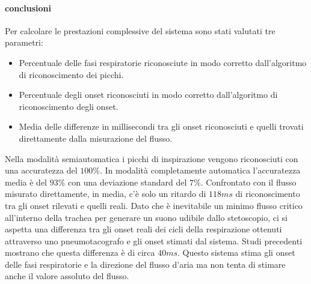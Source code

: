 \begin{frame}
  \paragraph{conclusioni}
    Per calcolare le prestazioni complessive del sistema sono stati valutati tre parametri:
    \begin{itemize}
      \item 
	Percentuale delle fasi respiratorie riconosciute in modo corretto dall'algoritmo di riconoscimento dei picchi.
      \item
	Percentuale degli onset riconosciuti in modo corretto dall'algoritmo di riconoscimento degli onset.
      \item
	Media delle differenze in millisecondi tra gli onset riconosciuti e quelli trovati direttamente dalla misurazione del flusso.
    \end{itemize}
    Nella modalit\`a semiautomatica i picchi di inspirazione vengono riconosciuti con una accuratezza del $100\%$. 
    In modalit\`a completamente automatica l'accuratezza media \`e del $93\%$ con una deviazione standard del $7\%$. 
    Confrontato con il flusso misurato direttamente, in media, c'\`e solo un ritardo di $118 ms$ di riconoscimento tra gli onset rilevati e quelli reali.
    Dato che \`e inevitabile un minimo flusso critico all'interno della trachea per generare un suono udibile dallo stetoscopio, ci si aspetta una differenza tra gli onset reali dei cicli della respirazione ottenuti attraverso uno pneumotacografo e gli onset stimati dal sistema. 
    Studi precedenti mostrano che questa differenza \`e di circa $40ms$\cite{CARPDWAM}. 
    Questo sistema stima gli onset delle fasi respiratorie e la direzione del flusso d'aria ma non tenta di stimare anche il valore assoluto del flusso.







\end{frame}
